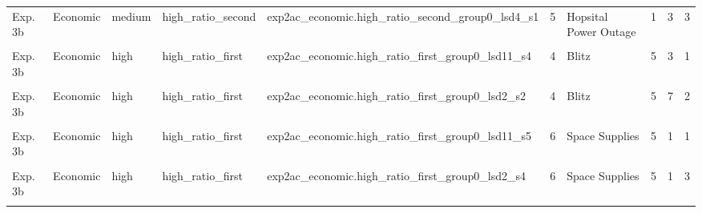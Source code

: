 \documentclass[
]{article}
\begin{document}
\begin{longtable}[t]{lllllrlrrr}
Exp. 3b & Economic & medium & high\_ratio\_second & exp2ac\_economic.high\_ratio\_second\_group0\_lsd4\_s1 & 5 & Hopsital Power Outage & 1 & 3 & 3\\
\addlinespace
\cellcolor{gray!10}{Exp. 3b} & \cellcolor{gray!10}{Economic} & \cellcolor{gray!10}{high} & \cellcolor{gray!10}{high\_ratio\_first} & \cellcolor{gray!10}{exp2ac\_economic.high\_ratio\_first\_group0\_lsd10\_s4} & \cellcolor{gray!10}{4} & \cellcolor{gray!10}{Blitz} & \cellcolor{gray!10}{5} & \cellcolor{gray!10}{5} & \cellcolor{gray!10}{1}\\
Exp. 3b & Economic & high & high\_ratio\_first & exp2ac\_economic.high\_ratio\_first\_group0\_lsd11\_s4 & 4 & Blitz & 5 & 3 & 1\\
\cellcolor{gray!10}{Exp. 3b} & \cellcolor{gray!10}{Economic} & \cellcolor{gray!10}{high} & \cellcolor{gray!10}{high\_ratio\_first} & \cellcolor{gray!10}{exp2ac\_economic.high\_ratio\_first\_group0\_lsd12\_s1} & \cellcolor{gray!10}{4} & \cellcolor{gray!10}{Blitz} & \cellcolor{gray!10}{5} & \cellcolor{gray!10}{9} & \cellcolor{gray!10}{1}\\
Exp. 3b & Economic & high & high\_ratio\_first & exp2ac\_economic.high\_ratio\_first\_group0\_lsd2\_s2 & 4 & Blitz & 5 & 7 & 2\\
\cellcolor{gray!10}{Exp. 3b} & \cellcolor{gray!10}{Economic} & \cellcolor{gray!10}{high} & \cellcolor{gray!10}{high\_ratio\_first} & \cellcolor{gray!10}{exp2ac\_economic.high\_ratio\_first\_group0\_lsd2\_s5} & \cellcolor{gray!10}{4} & \cellcolor{gray!10}{Blitz} & \cellcolor{gray!10}{5} & \cellcolor{gray!10}{6} & \cellcolor{gray!10}{2}\\
\addlinespace
Exp. 3b & Economic & high & high\_ratio\_first & exp2ac\_economic.high\_ratio\_first\_group0\_lsd11\_s5 & 6 & Space Supplies & 5 & 1 & 1\\
\cellcolor{gray!10}{Exp. 3b} & \cellcolor{gray!10}{Economic} & \cellcolor{gray!10}{high} & \cellcolor{gray!10}{high\_ratio\_first} & \cellcolor{gray!10}{exp2ac\_economic.high\_ratio\_first\_group0\_lsd2\_s3} & \cellcolor{gray!10}{6} & \cellcolor{gray!10}{Space Supplies} & \cellcolor{gray!10}{5} & \cellcolor{gray!10}{6} & \cellcolor{gray!10}{3}\\
Exp. 3b & Economic & high & high\_ratio\_first & exp2ac\_economic.high\_ratio\_first\_group0\_lsd2\_s4 & 6 & Space Supplies & 5 & 1 & 3\\
\cellcolor{gray!10}{Exp. 3b} & \cellcolor{gray!10}{Economic} & \cellcolor{gray!10}{high} & \cellcolor{gray!10}{high\_ratio\_first} & \cellcolor{gray!10}{exp2ac\_economic.high\_ratio\_first\_group0\_lsd4\_s4} & \cellcolor{gray!10}{6} & \cellcolor{gray!10}{Space Supplies} & \cellcolor{gray!10}{5} & \cellcolor{gray!10}{6} & \cellcolor{gray!10}{1}\\

\end{longtable}
\end{document}
